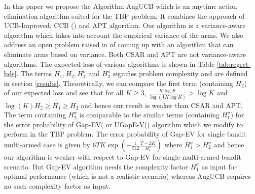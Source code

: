 In this paper we propose the Algorithm AugUCB which is an anytime action elimination algorithm suited for the TBP problem. It combines the approach of UCB-Improved, CCB (\cite{liu2016modification}) and APT algorithm. Our algorithm is a variance-aware algorithm which takes into account the empirical variance of the arms. We also address an open problem raised in \cite{auer2010ucb} of coming up with an algorithm that can eliminate arms based on variance. Both CSAR and APT are not variance-aware algorithms. The expected loss of various algorithms is shown in Table \ref{tab:regret-bds}.  The terms $H_1, H_2, H_1^{\sigma}$ and $H_2^{\sigma}$ signifies problem complexity and are defined in section \ref{results}. Theoretically, we can compare the first term (containing $H_2$) of our expected loss and see that for all $K\geq 3$, $\frac{K\log K}{\log(\frac{1}{2} K \log K)} > \log K$ and $\log(K)H_{2}\geq H_1 \geq H_2$ and hence our result is weaker than CSAR and APT. The term containing $H_{2}^{\sigma}$ is comparable to the similar terms (containing $H_1^{\sigma}$) for the error probability of Gap-EV(\cite{gabillon2011multi} or UGapE-V(\cite{gabillon2012best}) algorithm which we modify to perform in the TBP problem. The error probability of Gap-EV for single bandit multi-armed case is given by $6TK\exp(-\frac{1}{512}\frac{T-2K}{H_1^{\sigma}})$ where $H_1^{\sigma} > H_2^{\sigma}$ and hence our algorithm is weaker with respect to Gap-EV for single  multi-armed bandit scenario. But Gap-EV algorithm needs the complexity factor $H_1^{\sigma}$ as input for optimal performance (which is not a realistic scenario) whereas AugUCB requires no such complexity factor as input. 

